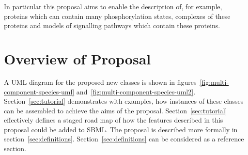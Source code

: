 \documentclass{cekarticle}
\begin{document}
In particular this proposal aims to enable the description of, for example, proteins which
can contain many phosphorylation states,
complexes of these proteins and models of signalling pathways which contain these proteins.

\clearpage

\section{Overview of Proposal}

A UML diagram for the proposed new classes is shown in
figures~\ref{fig:multi-component-species-uml}
and~\ref{fig:multi-component-species-uml2}.
Section~\ref{sec:tutorial} demonstrates with examples, how
instances of these classes can be assembled to achieve the aims of
the proposal.  Section~\ref{sec:tutorial} effectively defines a
staged road map of how the features described in this proposal
could be added to SBML. The proposal is described more formally in
section~\ref{sec:definitions}. Section~\ref{sec:definitions} can
be considered as a reference section.
\end{document}
